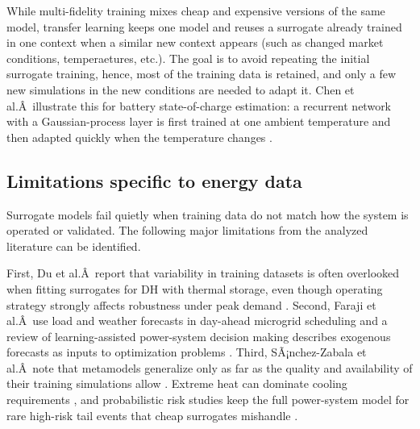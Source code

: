 While multi-fidelity training mixes cheap and expensive versions of the
same model, transfer learning keeps one model and reuses a surrogate
already trained in one context when a similar new context appears (such
as changed market conditions, temperaetures, etc.). The goal is to avoid
repeating the initial surrogate training, hence, most of the training
data is retained, and only a few new simulations in the new conditions
are needed to adapt it. Chen et al.Â~illustrate this for battery
state-of-charge estimation: a recurrent network with a Gaussian-process
layer is first trained at one ambient temperature and then adapted
quickly when the temperature changes \cite{Chen202514792}.

\subsection{Limitations specific to energy data}
\label{sec:doe:pitfalls}

Surrogate models fail quietly when training data do not match how the
system is operated or validated. The following major limitations from
the analyzed literature can be identified.

First, Du et al.Â~report that variability in training datasets is often
overlooked when fitting surrogates for DH with thermal storage, even
though operating strategy strongly affects robustness under peak demand
\cite{Du2025}. Second, Faraji et al.Â~use load and weather forecasts in
day-ahead microgrid scheduling \cite{Faraji2020157284} and a review of
learning-assisted power-system decision making describes exogenous
forecasts as inputs to optimization problems \cite{Lim2025}. Third,
SÃ¡nchez-Zabala et al.Â~note that metamodels generalize only as far as the
quality and availability of their training simulations allow
\cite{Sánchez-Zabala2024}. Extreme heat can dominate cooling requirements
\cite{Morakinyo201973}, and probabilistic risk studies keep the full
power-system model for rare high-risk tail events that cheap surrogates
mishandle \cite{Xu20203127}.
